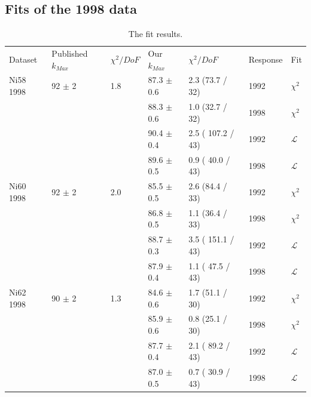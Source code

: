 \subsection { Fits of the 1998 data }
\begin{table}[h]
  \begin{center}
    \begin{tabular}{|l||l|l|l|l|l|l|}
      \hline
      Dataset & Published $k_{Max}$ & $\chi^2 / DoF$ & Our $k_{Max}$ & $\chi^2 / DoF$  & Response & Fit \\
      \hhline{|=||=|=|=|=|=|=|}
       Ni58 1998 & 92   $\pm$ 2   & 1.8 & 87.3 $\pm$ 0.6 &  2.3 (73.7 / 32) & 1992 & $\chi^2$ \\  
                 &                &     & 88.3 $\pm$ 0.6 &  1.0 (32.7 / 32) & 1998 & $\chi^2$ \\  
                                                                             
                &                 &     & 90.4 $\pm$ 0.4 & 2.5 ( 107.2 / 43) & 1992 & $\mathcal{L}$ \\
                &                 &     & 89.6 $\pm$ 0.5 & 0.9 ( 40.0 / 43) & 1998 & $\mathcal{L}$ \\
      \hline                                                                 
       Ni60 1998 & 92   $\pm$ 2   & 2.0 & 85.5 $\pm$ 0.5 &  2.6 (84.4 / 33) & 1992 & $\chi^2$ \\  
                 &                &     & 86.8 $\pm$ 0.5 &  1.1 (36.4 / 33) & 1998 & $\chi^2$ \\  
                                                                             
                &                 &     & 88.7 $\pm$ 0.3 & 3.5 ( 151.1 / 43) & 1992 & $\mathcal{L}$ \\
                &                 &     & 87.9 $\pm$ 0.4 & 1.1 ( 47.5 / 43) & 1998 & $\mathcal{L}$ \\
      \hline                                                                 
       Ni62 1998 & 90   $\pm$ 2   & 1.3 & 84.6 $\pm$ 0.6 &  1.7 (51.1 / 30) & 1992 & $\chi^2$ \\  
                 &                &     & 85.9 $\pm$ 0.6 &  0.8 (25.1 / 30) & 1998 & $\chi^2$ \\  
                                                                             
                &                 &     & 87.7 $\pm$ 0.4 & 2.1 ( 89.2 / 43) & 1992 & $\mathcal{L}$ \\
                &                 &     & 87.0 $\pm$ 0.5 & 0.7 ( 30.9 / 43) & 1998 & $\mathcal{L}$ \\
      \hline                           
    \end{tabular}
  \end{center}
  \caption{The fit results.}
  \label{table:fits1998}
\end{table}

